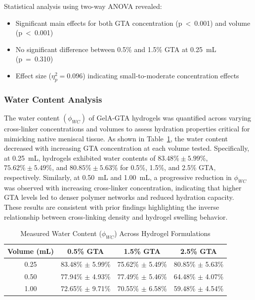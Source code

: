 Statistical analysis using two-way ANOVA revealed:
\begin{itemize}
    \item Significant main effects for both GTA concentration (p~<~0.001) and volume (p~<~0.001)
    \item No significant difference between 0.5\% and 1.5\% GTA at 0.25~mL (p~=~0.310)
    \item Effect size (\(\eta_p^2 = 0.096\)) indicating small-to-moderate concentration effects
\end{itemize}

\subsubsection{Water Content Analysis}

The water content \((\phi_{WC})\) of GelA-GTA hydrogels was quantified across varying cross-linker concentrations and volumes to assess hydration properties critical for mimicking native meniscal tissue. As shown in Table~\ref{tab:ch2_water_content}, the water content decreased with increasing GTA concentration at each volume tested. Specifically, at 0.25~mL, hydrogels exhibited water contents of \(83.48\% \pm 5.99\%\), \(75.62\% \pm 5.49\%\), and \(80.85\% \pm 5.63\%\) for 0.5\%, 1.5\%, and 2.5\% GTA, respectively. Similarly, at 0.50~mL and 1.00~mL, a progressive reduction in \(\phi_{WC}\) was observed with increasing cross-linker concentration, indicating that higher GTA levels led to denser polymer networks and reduced hydration capacity. These results are consistent with prior findings highlighting the inverse relationship between cross-linking density and hydrogel swelling behavior.

\vspace{1em}
\begin{table}[H]
\centering
\caption{Measured Water Content (\(\phi_{WC}\)) Across Hydrogel Formulations}
\label{tab:ch2_water_content}
\begin{tabular}{|c|c|c|c|}
\hline
\textbf{Volume (mL)} & \textbf{0.5\% GTA} & \textbf{1.5\% GTA} & \textbf{2.5\% GTA} \\ \hline
0.25 & 83.48\% $\pm$ 5.99\% & 75.62\% $\pm$ 5.49\% & 80.85\% $\pm$ 5.63\% \\ \hline
0.50 & 77.94\% $\pm$ 4.93\% & 77.49\% $\pm$ 5.46\% & 64.48\% $\pm$ 4.07\% \\ \hline
1.00 & 72.65\% $\pm$ 9.71\% & 70.55\% $\pm$ 6.58\% & 59.48\% $\pm$ 4.54\% \\ \hline
\end{tabular}
\end{table}

